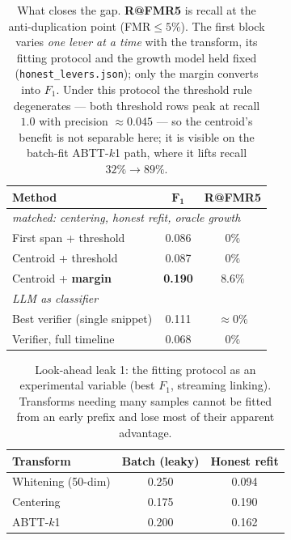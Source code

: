 \documentclass[11pt]{article}
\begin{document}
\begin{table}[t]
\centering\small
\begin{tabular}{lcc}
\hline
\textbf{Method} & $\mathbf{F_1}$ & \textbf{R@FMR5} \\
\hline
\multicolumn{3}{l}{\emph{matched: centering, honest refit, oracle growth}} \\
First span + threshold & 0.086 & $0\%$ \\
Centroid + threshold & 0.087 & $0\%$ \\
Centroid + \textbf{margin} & \textbf{0.190} & $\mathbf{8.6\%}$ \\
\hline
\multicolumn{3}{l}{\emph{LLM as classifier}} \\
Best verifier (single snippet) & 0.111 & ${\approx}0\%$ \\
Verifier, full timeline & 0.068 & $0\%$ \\
\hline
\end{tabular}
\caption{What closes the gap. \textbf{R@FMR5} is recall at the anti-duplication point
(FMR$\le5\%$). The first block varies \emph{one lever at a time} with the transform, its
fitting protocol and the growth model held fixed (\texttt{honest\_levers.json}); only the
margin converts into $F_1$. Under this protocol the threshold rule degenerates --- both
threshold rows peak at recall $1.0$ with precision ${\approx}0.045$ --- so the centroid's
benefit is not separable here; it is visible on the batch-fit ABTT-$k$1 path, where it lifts
recall $32\%{\to}89\%$.}
\label{tab:levers}
\end{table}

\begin{table}[t]
\centering\small\setlength{\tabcolsep}{4pt}
\begin{tabular}{lcc}
\hline
\textbf{Transform} & \textbf{Batch (leaky)} & \textbf{Honest refit} \\
\hline
Whitening (50-dim) & 0.250 & 0.094 \\
Centering & 0.175 & 0.190 \\
ABTT-$k$1 & 0.200 & 0.162 \\
\hline
\end{tabular}
\caption{Look-ahead leak 1: the fitting protocol as an experimental variable (best $F_1$,
streaming linking). Transforms needing many samples cannot be fitted from an early prefix
and lose most of their apparent advantage.}
\label{tab:honest}
\end{table}
\end{document}
